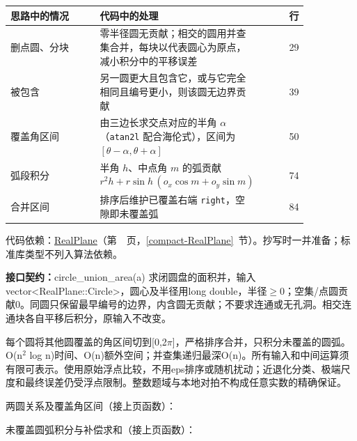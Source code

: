 \begin{center}\small
\begin{tabular}{@{}p{0.30\linewidth}p{0.55\linewidth}r@{}}
\toprule
思路中的情况 & 代码中的处理 & 行\\
\midrule
删点圆、分块 & 零半径圆无贡献；相交的圆用并查集合并，每块以代表圆心为原点，减小积分中的平移误差 & 29\\
被包含 & 另一圆更大且包含它，或与它完全相同且编号更小，则该圆无边界贡献 & 39\\
覆盖角区间 & 由三边长求交点对应的半角 $\alpha$（\texttt{atan2l} 配合海伦式），区间为 $[\theta-\alpha,\theta+\alpha]$ & 50\\
弧段积分 & 半角 $h$、中点角 $m$ 的弧贡献 $r^2h+r\sin h\,(o_x\cos m+o_y\sin m)$ & 74\\
合并区间 & 排序后维护已覆盖右端 \texttt{right}，空隙即未覆盖弧 & 84\\
\bottomrule
\end{tabular}
\end{center}

代码依赖：\hyperref[compact-RealPlane]{RealPlane}（第~\pageref{compact-RealPlane}~页，\ref{compact-RealPlane}~节）。抄写时一并准备；标准库类型不列入算法依赖。

{\sloppy{}\noindent\textbf{接口契约：}circle\_union\_area(a) 求闭圆盘的面积并，输入vector<RealPlane::Circle>，圆心及半径用long double，半径$\ge$0；空集/点圆贡献0。同圆只保留最早编号的边界，内含圆无贡献；不要求连通或无孔洞。相交连通块各自平移后积分，原输入不改变。

每个圆将其他圆覆盖的角区间切到[0,2$\pi$]，严格排序合并，只积分未覆盖的圆弧。O(n$^{2}$ log n)时间、O(n)额外空间；并查集递归最深O(n)。所有输入和中间运算须有限可表示。使用原始浮点比较，不用eps排序或随机扰动；近退化分类、极端尺度和最终误差仍受浮点限制。整数题域与本地对拍不构成任意实数的精确保证。\par}

\Needspace{440pt}



\newpage

两圆关系及覆盖角区间（接上页函数）：



\newpage

未覆盖圆弧积分与补偿求和（接上页函数）：



